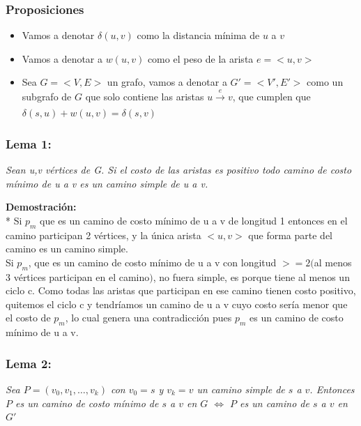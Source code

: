 \documentclass{article}
\begin{document}
    
    \subsubsection{Proposiciones }
    \begin{itemize}
        \item Vamos a denotar $\delta\left(u,v\right)$ como la distancia m\'inima de $u$ a $v$ 
        \item Vamos a denotar a $w(u,v)$ como el peso de la arista $e= <u,v>$ 
        \item Sea $G = <V,E>$ un grafo, vamos a denotar a $G' = <V',E'>$ como un subgrafo de $G$ que solo contiene las aristas $ u \xrightarrow[]{e} v$, 
        que cumplen que $\delta\left(s,u\right) + w \left(u,v\right) = \delta\left(s,v\right)$   
    \end{itemize}

    \subsubsection{Lema 1:}

    \textit{Sean u,v v\'ertices de G. Si el costo de las aristas es positivo todo camino de costo m\'inimo de u a v es un camino simple de u a v.}
    
    \vspace*{0.3cm} 

    
    \noindent \textbf{Demostraci\'on:}
    \\*
    Si $p_{m}$ que es un camino de costo m\'inimo de u a v de longitud 1 entonces en el camino participan 2 v\'ertices, y la \'unica arista $<u,v>$
    que forma parte del camino es un camino simple.\\ 
    Si $p_{m}$, que es un camino de costo m\'inimo de u a v con longitud $>=2$$($al menos 3 v\'ertices participan en el camino$)$, no fuera simple, es 
    porque tiene al menos un ciclo c. Como todas las aristas que participan en ese camino tienen costo positivo, quitemos el ciclo c y tendr\'iamos 
    un camino de u a v cuyo costo ser\'ia menor que el costo de $p_{m}$, lo cual genera
    una contradicci\'on pues $p_{m}$ es un camino de costo m\'inimo de u a v.\\
    
    \subsubsection{Lema 2:}
        
    \noindent \textit{Sea $P = \left(v_0,v_1,\dots , v_k \right)$ con $v_0 = s$ y $v_k = v$ un camino simple de $s$ a $v$. Entonces $P$ es un 
            camino de costo m\'inimo de $s$ a $v$  en $G$ $\Longleftrightarrow$  $P$ es un camino de $s$ a $v$ en $G'$}
    
\end{document}
